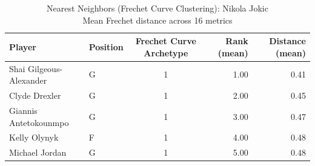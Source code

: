 \begin{table}[t]
\caption*{
{\fontsize{20}{25} Nearest Neighbors (Frechet Curve Clustering): Nikola Jokic\fontsize{12}{15}\selectfont } \\ 
{\fontsize{14}{17}\selectfont  Mean Frechet distance across 16 metrics\fontsize{12}{15}\selectfont }
} 
\fontsize{12.0pt}{14.0pt}\selectfont
\begin{tabular*}{\linewidth}{@{\extracolsep{\fill}}llcrr}
\toprule
Player & Position & Frechet Curve Archetype & Rank (mean) & Distance (mean) \\ 
\midrule\addlinespace[2.5pt]
Shai Gilgeous-Alexander & G & 1 & 1.00 & 0.41 \\ 
Clyde Drexler & G & 1 & 2.00 & 0.45 \\ 
Giannis Antetokounmpo & G & 1 & 3.00 & 0.47 \\ 
Kelly Olynyk & F & 1 & 4.00 & 0.48 \\ 
Michael Jordan & G & 1 & 5.00 & 0.48 \\ 
\bottomrule
\end{tabular*}
\end{table}


